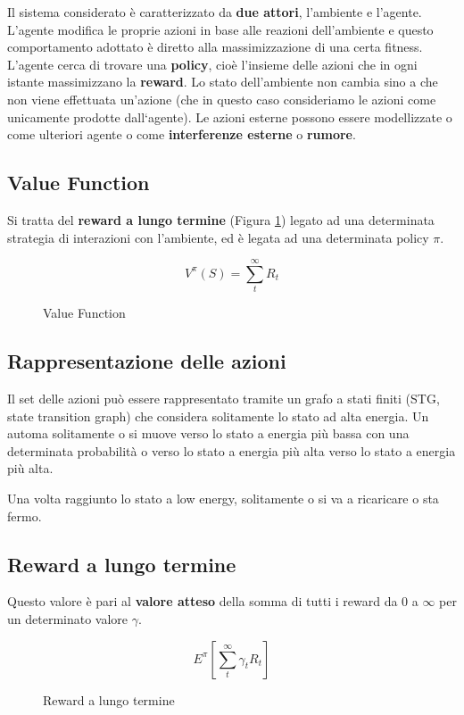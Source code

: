 \documentclass[\main/main.tex]{subfiles}
\begin{document}
Il sistema considerato è caratterizzato da \textbf{due attori}, l'ambiente e l'agente. L'agente modifica le proprie azioni in base alle reazioni dell'ambiente e questo comportamento adottato è diretto alla massimizzazione di una certa fitness. L'agente cerca di trovare una \textbf{policy}, cioè l'insieme delle azioni che in ogni istante massimizzano la \textbf{reward}. Lo stato dell'ambiente non cambia sino a che non viene effettuata un'azione (che in questo caso consideriamo le azioni come unicamente prodotte dall`agente). Le azioni esterne possono essere modellizzate o come ulteriori agente o come \textbf{interferenze esterne} o \textbf{rumore}.

\subsection{Value Function}
Si tratta del \textbf{reward a lungo termine} (Figura \ref{formula:value_function}) legato ad una determinata strategia di interazioni con l'ambiente, ed è legata ad una determinata policy $\pi$.

\begin{figure}
  \[
    V^\pi (S) = \sum_t^\infty R_t
  \]
  \caption{Value Function}
  \label{formula:value_function}
\end{figure}

\subsection{Rappresentazione delle azioni}
Il set delle azioni può essere rappresentato tramite un grafo a stati finiti (STG, state transition graph) che considera solitamente lo stato ad alta energia. Un automa solitamente o si muove verso lo stato a energia più bassa con una determinata probabilità o verso lo stato a energia più alta verso lo stato a energia più alta.

Una volta raggiunto lo stato a low energy, solitamente o si va a ricaricare o sta fermo.

\subsection{Reward a lungo termine}
Questo valore è pari al \textbf{valore atteso} della somma di tutti i reward da $0$ a $\infty$ per un determinato valore $\gamma$.
\begin{figure}
  \[
    E^\pi \left[ \sum_t^\infty \gamma_t R_t \right]
  \]
  \caption{Reward a lungo termine}
\end{figure}
\end{document}
